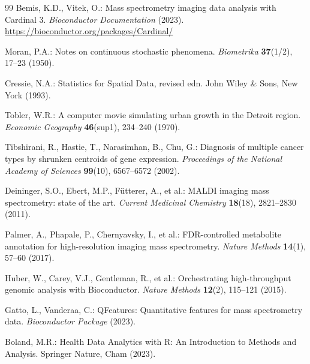 \documentclass[11pt,twoside,openright]{book}
\begin{document}
\begin{thebibliography}{99}
Bemis, K.D., Vitek, O.: Mass spectrometry imaging data analysis with Cardinal 3.
\textit{Bioconductor Documentation} (2023).
\url{https://bioconductor.org/packages/Cardinal/}

Moran, P.A.: Notes on continuous stochastic phenomena.
\textit{Biometrika} \textbf{37}(1/2), 17--23 (1950).

Cressie, N.A.: Statistics for Spatial Data, revised edn.
John Wiley \& Sons, New York (1993).

Tobler, W.R.: A computer movie simulating urban growth in the Detroit region.
\textit{Economic Geography} \textbf{46}(sup1), 234--240 (1970).

Tibshirani, R., Hastie, T., Narasimhan, B., Chu, G.: Diagnosis of multiple cancer types by shrunken centroids of gene expression.
\textit{Proceedings of the National Academy of Sciences} \textbf{99}(10), 6567--6572 (2002).

Deininger, S.O., Ebert, M.P., F{\"u}tterer, A., et al.: MALDI imaging mass spectrometry: state of the art.
\textit{Current Medicinal Chemistry} \textbf{18}(18), 2821--2830 (2011).

Palmer, A., Phapale, P., Chernyavsky, I., et al.: FDR-controlled metabolite annotation for high-resolution imaging mass spectrometry.
\textit{Nature Methods} \textbf{14}(1), 57--60 (2017).

Huber, W., Carey, V.J., Gentleman, R., et al.: Orchestrating high-throughput genomic analysis with Bioconductor.
\textit{Nature Methods} \textbf{12}(2), 115--121 (2015).

Gatto, L., Vanderaa, C.: QFeatures: Quantitative features for mass spectrometry data.
\textit{Bioconductor Package} (2023).

Boland, M.R.: Health Data Analytics with R: An Introduction to Methods and Analysis.
Springer Nature, Cham (2023).

\end{thebibliography}
\end{document}
